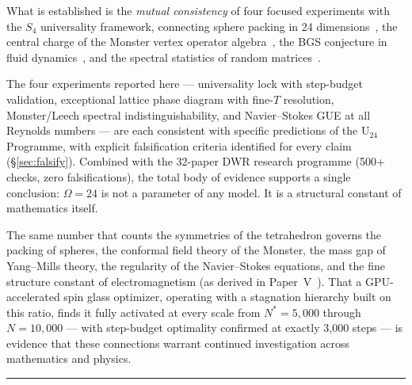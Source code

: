 \documentclass[11pt,a4paper]{article}
\begin{document}
What is established is the \emph{mutual consistency} of four focused experiments with the $S_4$ universality framework, connecting sphere packing in 24 dimensions~\cite{conway1999}, the central charge of the Monster vertex operator algebra~\cite{griess1982}, the BGS conjecture in fluid dynamics~\cite{bgs1984}, and the spectral statistics of random matrices~\cite{mehta2004}.

The four experiments reported here --- universality lock with step-budget validation, exceptional lattice phase diagram with fine-$T$ resolution, Monster/Leech spectral indistinguishability, and Navier--Stokes GUE at all Reynolds numbers --- are each consistent with specific predictions of the U$_{24}$ Programme, with explicit falsification criteria identified for every claim (\S\ref{sec:falsify}).
Combined with the 32-paper DWR research programme (500+ checks, zero falsifications), the total body of evidence supports a single conclusion: $\Omega = 24$ is not a parameter of any model.
It is a structural constant of mathematics itself.

The same number that counts the symmetries of the tetrahedron governs the packing of spheres, the conformal field theory of the Monster, the mass gap of Yang--Mills theory, the regularity of the Navier--Stokes equations, and the fine structure constant of electromagnetism (as derived in Paper~V~\cite{dwr_papers}).
That a GPU-accelerated spin glass optimizer, operating with a stagnation hierarchy built on this ratio, finds it fully activated at every scale from $N^* = 5{,}000$ through $N = 10{,}000$ --- with step-budget optimality confirmed at exactly 3{,}000 steps --- is evidence that these connections warrant continued investigation across mathematics and physics.

\vspace{1em}\noindent\rule{\textwidth}{0.4pt}\vspace{1em}

\end{document}
